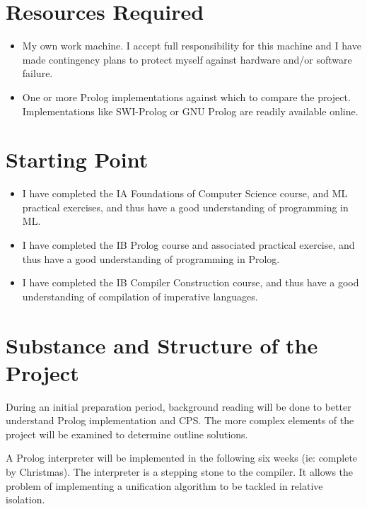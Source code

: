 \documentclass[12pt]{article}
\begin{document}

\section*{Resources Required}

\begin{itemize}
\item My own work machine. I accept full responsibility for this machine and I have made contingency plans to protect myself against hardware and/or software failure.
\item One or more Prolog implementations against which to compare the project. Implementations like SWI-Prolog or GNU Prolog are readily available online.
\end{itemize}

\section*{Starting Point}

\begin{itemize}
\item I have completed the IA Foundations of Computer Science course, and ML practical exercises, and thus have a good understanding of programming in ML.
\item I have completed the IB Prolog course and associated practical exercise, and thus have a good understanding of programming in Prolog.
\item I have completed the IB Compiler Construction course, and thus have a good understanding of compilation of imperative languages.
\end{itemize}

\section*{Substance and Structure of the Project}

During an initial preparation period, background reading will be done to better understand Prolog implementation and CPS. The more complex elements of the project will be examined to determine outline solutions. 

A Prolog interpreter will be implemented in the following six weeks (ie: complete by Christmas). The interpreter is a stepping stone to the compiler. It allows the problem of implementing a unification algorithm to be tackled in relative isolation.
\end{document}
